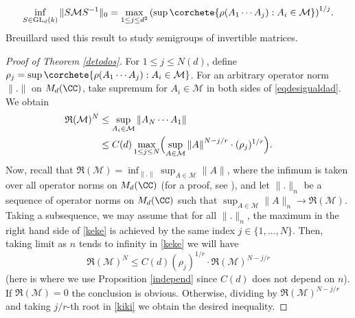 \begin{equation*}
\inf_{S\in \mathrm{GL}_d(k)}{\|S\mathcal{M}S^{-1}\|_0}=\max_{1\leq j\leq d^2}{\left(\sup\corchete{\rho(A_{1}\cdots A_{j}) : A_{i}\in \mathcal{M}}\right)^{1/j}}.
\end{equation*}
Breuillard used this result to study semigroups of invertible matrices.
\begin{proof}[Proof of Theorem \ref{detodos}]
For $1\leq j\leq N(d)$, define $\rho_{j}=\sup\corchete{\rho(A_{1}\cdots A_{j}) : A_{i}\in \mathcal{M}}$. For an arbitrary operator norm $\|.\|$ on $M_{d}(\CC)$, take supremum for $A_{i}\in \mathcal{M}$ in both sides of \eqref{eqdesigualdad}. We obtain
\begin{alignat}{2}
\mathfrak{R}(\mathcal{M})^{N} & \leq\sup_{A_{i}\in \mathcal{M}}{\|A_{N}\cdots A_{1}\|} \notag\\
& \leq C(d) \max_{1\leq j\leq N}\Bigl(\sup_{A\in \mathcal{M}}{\|A\|}^{N-j/r}\cdot (\rho_{j})^{1/r}\Bigr). &\quad \label{keke}
\end{alignat}
Now, recall that $\mathfrak{R}(\mathcal{M})=\inf_{\|.\|}{\sup_{A\in \mathcal{M}}{\|A\|}}$, where the infimum is taken over all operator norms on $M_{d}(\CC)$ (for a proof, see \cite{rota}), and let $\|.\|_{n}$ be a sequence of operator norms on $M_{d}(\CC)$ such that $\sup_{A\in \mathcal{M}}{\|A\|_{n}}\to \mathfrak{R}(\mathcal{M})$. Taking a subsequence, we may assume that for all $\|.\|_{n}$, the maximum in the right hand side of \eqref{keke} is achieved by the same index $j\in \{1,\dots, N \}$. Then, taking limit as $n$ tends to infinity in \eqref{keke} we will have
\begin{equation}\label{kiki}
\mathfrak{R}(\mathcal{M})^{N}\leq C(d)(\rho_{j})^{1/r}\cdot\mathfrak{R}(\mathcal{M})^{N-j/r }
\end{equation}
(here is where we use Proposition \ref{independ} since $C(d)$ does not depend on $n$). If $\mathfrak{R}(\mathcal{M})=0$ the conclusion is obvious. Otherwise, dividing by $\mathfrak{R}(\mathcal{M})^{N-j/r}$ and taking $j/r$-th root in \eqref{kiki} we obtain the desired inequality.
\end{proof}

